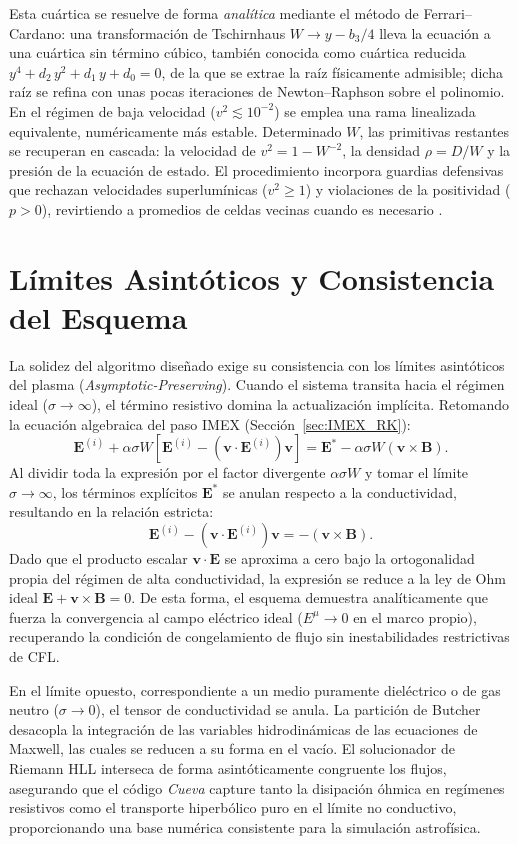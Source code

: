 Esta cuártica se resuelve de forma \emph{analítica} mediante el método de Ferrari--Cardano: una transformación de Tschirnhaus $W \to y - b_3/4$ lleva la ecuación a una cuártica sin término cúbico, también conocida como cuártica reducida $y^4 + d_2\,y^2 + d_1\,y + d_0 = 0$, de la que se extrae la raíz físicamente admisible; dicha raíz se refina con unas pocas iteraciones de Newton--Raphson sobre el polinomio. En el régimen de baja velocidad ($v^2 \lesssim 10^{-2}$) se emplea una rama linealizada equivalente, numéricamente más estable. Determinado $W$, las primitivas restantes se recuperan en cascada: la velocidad de $v^2 = 1 - W^{-2}$, la densidad $\rho = D/W$ y la presión de la ecuación de estado. El procedimiento incorpora guardias defensivas que rechazan velocidades superlumínicas ($v^2 \ge 1$) y violaciones de la positividad ($p > 0$), revirtiendo a promedios de celdas vecinas cuando es necesario \parencite{mizuno-2013}.

\section{Límites Asintóticos y Consistencia del Esquema}
\label{sec:Limites_Asintoticos}

\primerparrafo La solidez del algoritmo diseñado exige su consistencia con los límites asintóticos del plasma (\textit{Asymptotic-Preserving}). Cuando el sistema transita hacia el régimen ideal ($\sigma \to \infty$), el término resistivo domina la actualización implícita. Retomando la ecuación algebraica del paso IMEX (Sección~\ref{sec:IMEX_RK}):
$$
\mathbf{E}^{(i)} + \alpha \sigma W \left[ \mathbf{E}^{(i)} - (\mathbf{v} \cdot \mathbf{E}^{(i)}) \mathbf{v} \right] = \mathbf{E}^* - \alpha \sigma W (\mathbf{v} \times \mathbf{B}).
$$
Al dividir toda la expresión por el factor divergente $\alpha \sigma W$ y tomar el límite $\sigma \to \infty$, los términos explícitos $\mathbf{E}^*$ se anulan respecto a la conductividad, resultando en la relación estricta:
$$
\mathbf{E}^{(i)} - (\mathbf{v} \cdot \mathbf{E}^{(i)}) \mathbf{v} = - (\mathbf{v} \times \mathbf{B}).
$$
Dado que el producto escalar $\mathbf{v} \cdot \mathbf{E}$ se aproxima a cero bajo la ortogonalidad propia del régimen de alta conductividad, la expresión se reduce a la ley de Ohm ideal $\mathbf{E} + \mathbf{v} \times \mathbf{B} = 0$. De esta forma, el esquema demuestra analíticamente que fuerza la convergencia al campo eléctrico ideal ($E^\mu \to 0$ en el marco propio), recuperando la condición de congelamiento de flujo sin inestabilidades restrictivas de CFL.

\primerparrafo En el límite opuesto, correspondiente a un medio puramente dieléctrico o de gas neutro ($\sigma \to 0$), el tensor de conductividad se anula. La partición de Butcher desacopla la integración de las variables hidrodinámicas de las ecuaciones de Maxwell, las cuales se reducen a su forma en el vacío. El solucionador de Riemann HLL interseca de forma asintóticamente congruente los flujos, asegurando que el código \textit{Cueva} capture tanto la disipación óhmica en regímenes resistivos como el transporte hiperbólico puro en el límite no conductivo, proporcionando una base numérica consistente para la simulación astrofísica.
